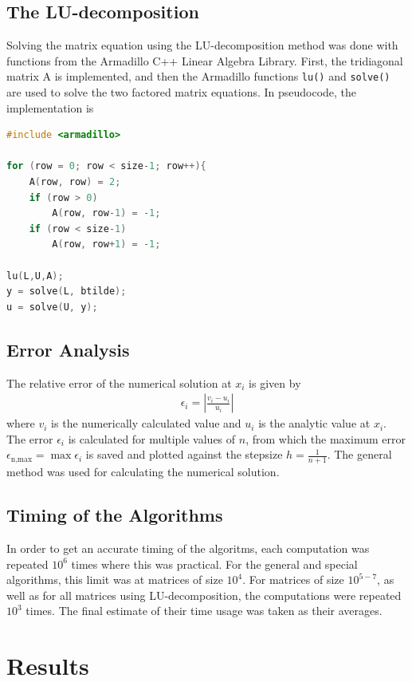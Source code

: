 \documentclass[aps,prl,reprint,toc]{revtex4-1}
\begin{document}
\subsection{The LU-decomposition}
Solving the matrix equation using the LU-decomposition method was done with
functions from the Armadillo C++ Linear Algebra Library. First, the tridiagonal
matrix A is implemented, and then the Armadillo functions \texttt{lu()} and \texttt{solve()}
are used to solve the two factored matrix equations. In pseudocode, the implementation is
\begin{lstlisting}[language=cpp, caption={Pseudocode of LU-decomposition method implementation}]
#include <armadillo>

for (row = 0; row < size-1; row++){
    A(row, row) = 2;
    if (row > 0)
        A(row, row-1) = -1;
    if (row < size-1)
        A(row, row+1) = -1;

lu(L,U,A);
y = solve(L, btilde);
u = solve(U, y);
\end{lstlisting}
\subsection{Error Analysis}
The relative error of the numerical solution at $x_i$ is given by
\begin{align*}
  \epsilon_i = \left| \frac{v_i - u_i}{u_i} \right|
\end{align*}
where $v_i$ is the numerically calculated value and $u_i$ is the analytic value
at \(x_{i}\).
The error $\epsilon_i$ is calculated for multiple values of \(n\), from which the 
maximum error $\epsilon_\text{n,max} = \max{\epsilon_{i}}$ is saved and plotted
against the stepsize \(h = \frac{1}{n+1}\). 
The general method was used for calculating the numerical solution.

\subsection{Timing of the Algorithms}
\label{sec:timingmethod}
In order to get an accurate timing of the algoritms, each computation was
repeated \(10^6\) times where this was practical. For the general and special
algorithms, this limit was at matrices of size \(10^4\). For matrices of size
\(10^{5-7}\), as well as for all matrices using LU-decomposition, the
computations were repeated \(10^{3}\) times. The final estimate of their time
usage was taken as their averages.

\section{Results}
\end{document}

